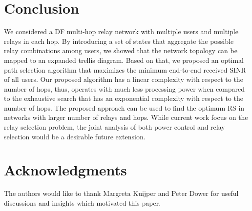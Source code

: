 \documentclass[12pt,draftclsnofoot,onecolumn]{IEEEtran}
\begin{document}
	\section{Conclusion}\label{Sec-Plans}
	We considered a DF multi-hop relay network with multiple users and multiple relays in each hop. By introducing a set of states that aggregate the possible relay combinations among users, we showed that the network topology can be mapped to an expanded trellis diagram. Based on that, we proposed an optimal path selection algorithm that maximizes the minimum end-to-end received SINR of all users. Our proposed algorithm has a linear complexity with respect to the number of hops, thus, operates with much less processing power when compared to the exhaustive search that has an exponential complexity with respect to the number of hops. The proposed approach can be used to find the optimum RS in networks with larger number of relays and hops. While current work focus on the relay selection problem, the joint analysis of both power control and relay selection would be a desirable future extension.
	
	\section*{Acknowledgments}
	The authors would like to thank Margreta Kuijper and Peter Dower for useful discussions and insights which motivated this paper.
	
	
	
	
	
	
\end{document}
